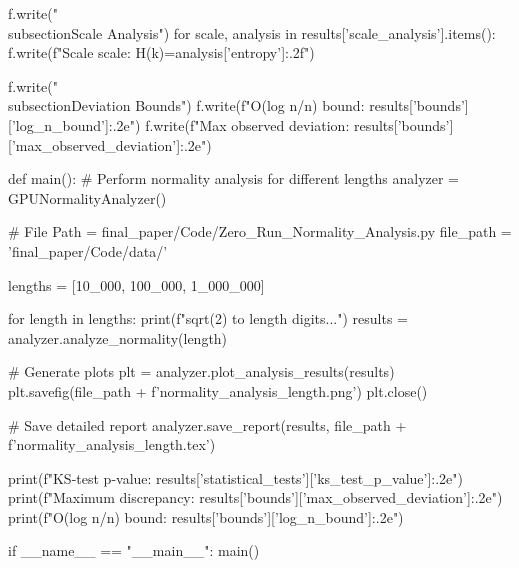             f.write("\\subsection{Scale Analysis}\n")
            for scale, analysis in results['scale_analysis'].items():
                f.write(f"Scale {scale}: H(k)={analysis['entropy']:.2f}\n")
            
            f.write("\\subsection{Deviation Bounds}\n")
            f.write(f"O(log n/n) bound: {results['bounds']['log_n_bound']:.2e}\n")
            f.write(f"Max observed deviation: {results['bounds']['max_observed_deviation']:.2e}\n")
        
def main():
    # Perform normality analysis for different lengths
    analyzer = GPUNormalityAnalyzer()

    # File Path = final_paper/Code/Zero_Run_Normality_Analysis.py
    file_path = 'final_paper/Code/data/'
    
    lengths = [10_000, 100_000, 1_000_000]
    
    for length in lengths:
        print(f"\nAnalyzing sqrt(2) to {length} digits...")
        results = analyzer.analyze_normality(length)
        
        # Generate plots
        plt = analyzer.plot_analysis_results(results)
        plt.savefig(file_path + f'normality_analysis_{length}.png')
        plt.close()
        
        # Save detailed report
        analyzer.save_report(results, file_path + f'normality_analysis_{length}.tex')
        
        print(f"KS-test p-value: {results['statistical_tests']['ks_test_p_value']:.2e}")
        print(f"Maximum discrepancy: {results['bounds']['max_observed_deviation']:.2e}")
        print(f"O(log n/n) bound: {results['bounds']['log_n_bound']:.2e}")

if __name__ == "__main__":
    main()